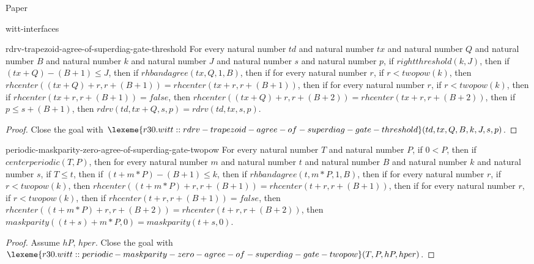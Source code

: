 \begin{lexlean}{Paper}
\begin{section}{witt-interfaces}
  \begin{theorem}{rdrv-trapezoid-agree-of-superdiag-gate-threshold}
  For every natural number \(td\) and natural number \(tx\) and natural number \(Q\) and natural number \(B\) and natural number \(k\) and natural number \(J\) and natural number \(s\) and natural number \(p\), if \(rightthreshold(k, J)\), then if \((tx + Q) - (B + 1) ≤ J\), then if \(rhbandagree(tx, Q, 1, B)\), then if for every natural number \(r\), if \(r < twopow(k)\), then \(rhcenter((tx + Q) + r, r + (B + 1)) = rhcenter(tx + r, r + (B + 1))\), then if for every natural number \(r\), if \(r < twopow(k)\), then if \(rhcenter(tx + r, r + (B + 1)) = false\), then \(rhcenter((tx + Q) + r, r + (B + 2)) = rhcenter(tx + r, r + (B + 2))\), then if \(p ≤ s + (B + 1)\), then \(rdrv(td, tx + Q, s, p) = rdrv(td, tx, s, p)\).
  \begin{proof}
  Close the goal with \(\lexeme{r30.witt::rdrv-trapezoid-agree-of-superdiag-gate-threshold}(td, tx, Q, B, k, J, s, p)\).
  \end{proof}
  \end{theorem}

  \begin{theorem}{periodic-maskparity-zero-agree-of-superdiag-gate-twopow}
  For every natural number \(T\) and natural number \(P\), if \(0 < P\), then if \(centerperiodic(T, P)\), then for every natural number \(m\) and natural number \(t\) and natural number \(B\) and natural number \(k\) and natural number \(s\), if \(T ≤ t\), then if \((t + m * P) - (B + 1) ≤ k\), then if \(rhbandagree(t, m * P, 1, B)\), then if for every natural number \(r\), if \(r < twopow(k)\), then \(rhcenter((t + m * P) + r, r + (B + 1)) = rhcenter(t + r, r + (B + 1))\), then if for every natural number \(r\), if \(r < twopow(k)\), then if \(rhcenter(t + r, r + (B + 1)) = false\), then \(rhcenter((t + m * P) + r, r + (B + 2)) = rhcenter(t + r, r + (B + 2))\), then \(maskparity((t + s) + m * P, 0) = maskparity(t + s, 0)\).
  \begin{proof}
  Assume \(hP\), \(hper\).
  Close the goal with \(\lexeme{r30.witt::periodic-maskparity-zero-agree-of-superdiag-gate-twopow}(T, P, hP, hper)\).
  \end{proof}
  \end{theorem}


\end{section}
\end{lexlean}
